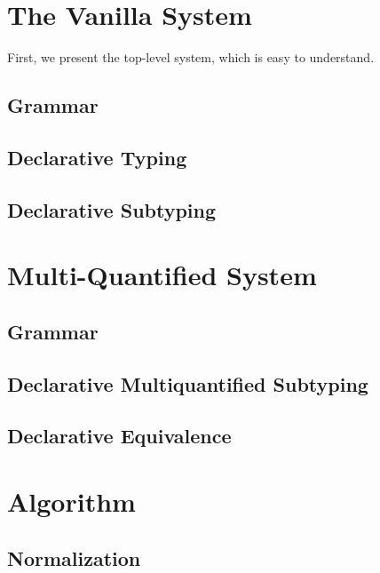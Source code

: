 \documentclass[a4,natbib=false]{article}
\begin{document}
\section{The Vanilla System}



First, we present the top-level system, which is easy to understand.

\subsection{Grammar}
\ottgrammartabular{
  \ottP\ottinterrule
  \ottN\ottinterrule
  \ottv\ottinterrule
  \ottc\ottinterrule
}

\subsection{Declarative Typing}
\ottdefnsDT

\subsection{Declarative Subtyping}
\ottdefnsDZero

\section{Multi-Quantified System}
\subsection{Grammar}
\ottgrammartabular{
  \ottiP\ottinterrule
  \ottiN\ottinterrule
}
\subsection{Declarative Multiquantified Subtyping}
\ottdefnsDOne

\subsection{Declarative Equivalence}
\ottdefnsEOne



\section{Algorithm}

\subsection{Normalization}
\end{document}
